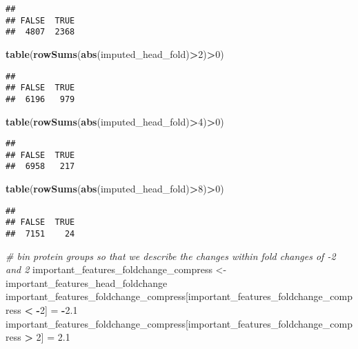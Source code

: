 \documentclass[]{article}
\newenvironment{Shaded}{\begin{snugshade}}{\end{snugshade}}
\newcommand{\KeywordTok}[1]{\textcolor[rgb]{0.13,0.29,0.53}{\textbf{#1}}}
\newcommand{\DecValTok}[1]{\textcolor[rgb]{0.00,0.00,0.81}{#1}}
\newcommand{\FloatTok}[1]{\textcolor[rgb]{0.00,0.00,0.81}{#1}}
\newcommand{\StringTok}[1]{\textcolor[rgb]{0.31,0.60,0.02}{#1}}
\newcommand{\CommentTok}[1]{\textcolor[rgb]{0.56,0.35,0.01}{\textit{#1}}}
\newcommand{\OperatorTok}[1]{\textcolor[rgb]{0.81,0.36,0.00}{\textbf{#1}}}
\newcommand{\NormalTok}[1]{#1}
\begin{document}
\begin{verbatim}
## 
## FALSE  TRUE 
##  4807  2368
\end{verbatim}

\begin{Shaded}
\begin{Highlighting}[]
\KeywordTok{table}\NormalTok{(}\KeywordTok{rowSums}\NormalTok{(}\KeywordTok{abs}\NormalTok{(imputed_head_fold)}\OperatorTok{>}\DecValTok{2}\NormalTok{)}\OperatorTok{>}\DecValTok{0}\NormalTok{)}
\end{Highlighting}
\end{Shaded}

\begin{verbatim}
## 
## FALSE  TRUE 
##  6196   979
\end{verbatim}

\begin{Shaded}
\begin{Highlighting}[]
\KeywordTok{table}\NormalTok{(}\KeywordTok{rowSums}\NormalTok{(}\KeywordTok{abs}\NormalTok{(imputed_head_fold)}\OperatorTok{>}\DecValTok{4}\NormalTok{)}\OperatorTok{>}\DecValTok{0}\NormalTok{)}
\end{Highlighting}
\end{Shaded}

\begin{verbatim}
## 
## FALSE  TRUE 
##  6958   217
\end{verbatim}

\begin{Shaded}
\begin{Highlighting}[]
\KeywordTok{table}\NormalTok{(}\KeywordTok{rowSums}\NormalTok{(}\KeywordTok{abs}\NormalTok{(imputed_head_fold)}\OperatorTok{>}\DecValTok{8}\NormalTok{)}\OperatorTok{>}\DecValTok{0}\NormalTok{)}
\end{Highlighting}
\end{Shaded}

\begin{verbatim}
## 
## FALSE  TRUE 
##  7151    24
\end{verbatim}

\begin{Shaded}
\begin{Highlighting}[]
\CommentTok{# bin protein groups so that we describe the changes within fold changes of -2 and 2}
\NormalTok{important_features_foldchange_compress <-}\StringTok{ }\NormalTok{important_features_head_foldchange}
\NormalTok{important_features_foldchange_compress[important_features_foldchange_compress }\OperatorTok{<}\StringTok{ }\OperatorTok{-}\DecValTok{2}\NormalTok{] =}\StringTok{ }\OperatorTok{-}\FloatTok{2.1}
\NormalTok{important_features_foldchange_compress[important_features_foldchange_compress }\OperatorTok{>}\StringTok{ }\DecValTok{2}\NormalTok{] =}\StringTok{ }\FloatTok{2.1}
\end{Highlighting}
\end{Shaded}
\end{document}
